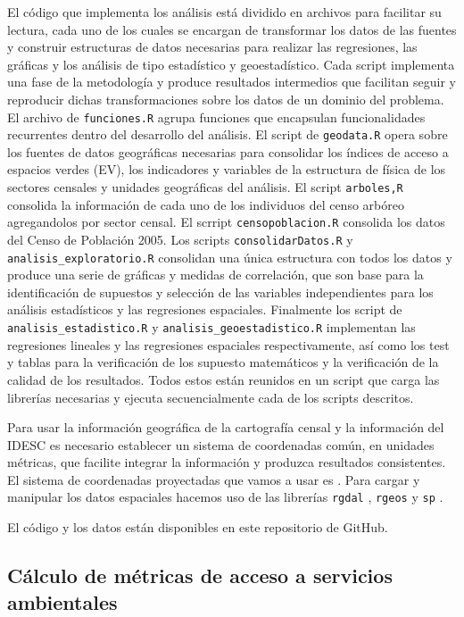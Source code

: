 \documentclass[12pt,]{book}
\begin{document}
El código que implementa los análisis está dividido en archivos para
facilitar su lectura, cada uno de los cuales se encargan de transformar
los datos de las fuentes y construir estructuras de datos necesarias
para realizar las regresiones, las gráficas y los análisis de tipo
estadístico y geoestadístico. Cada script implementa una fase de la
metodología y produce resultados intermedios que facilitan seguir y
reproducir dichas transformaciones sobre los datos de un dominio del
problema. El archivo de \texttt{funciones.R} agrupa funciones que
encapsulan funcionalidades recurrentes dentro del desarrollo del
análisis. El script de \texttt{geodata.R} opera sobre los fuentes de
datos geográficas necesarias para consolidar los índices de acceso a
espacios verdes (EV), los indicadores y variables de la estructura de
física de los sectores censales y unidades geográficas del análisis. El
script \texttt{arboles,R} consolida la información de cada uno de los
individuos del censo arbóreo agregandolos por sector censal. El scrript
\texttt{censopoblacion.R} consolida los datos del Censo de Población
2005. Los scripts \texttt{consolidarDatos.R} y
\texttt{analisis\_exploratorio.R} consolidan una única estructura con
todos los datos y produce una serie de gráficas y medidas de
correlación, que son base para la identificación de supuestos y
selección de las variables independientes para los análisis estadísticos
y las regresiones espaciales. Finalmente los script de
\texttt{analisis\_estadistico.R} y \texttt{analisis\_geoestadistico.R}
implementan las regresiones lineales y las regresiones espaciales
respectivamente, así como los test y tablas para la verificación de los
supuesto matemáticos y la verificación de la calidad de los resultados.
Todos estos están reunidos en un script que carga las librerías
necesarias y ejecuta secuencialmente cada de los scripts descritos.

Para usar la información geográfica de la cartografía censal y la
información del IDESC es necesario establecer un sistema de coordenadas
común, en unidades métricas, que facilite integrar la información y
produzca resultados consistentes. El sistema de coordenadas proyectadas
que vamos a usar es \citet{noauthor_magna-sirgas-cali_nodate}. Para
cargar y manipular los datos espaciales hacemos uso de las librerías
\texttt{rgdal} \citep{R-rgdal}, \texttt{rgeos} \citep{R-rgeos} y
\texttt{sp} \citep{R-sp}.

El código y los datos están disponibles en este repositorio de GitHub.

\subsection{Cálculo de métricas de acceso a servicios
ambientales}\label{calculo-de-metricas-de-acceso-a-servicios-ambientales}
\end{document}
